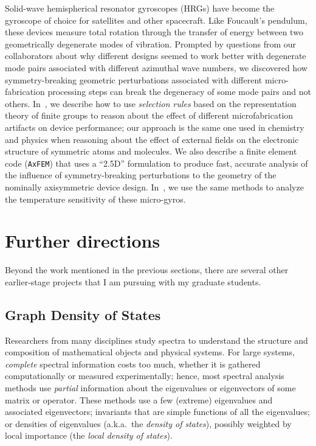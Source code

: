 \documentclass[11pt]{amsart}
\begin{document}
Solid-wave hemispherical resonator gyroscopes (HRGs) have become the
gyroscope of choice for satellites and other spacecraft.  Like Foucault's
pendulum, these devices measure total rotation through the transfer
of energy between two geometrically degenerate modes of vibration.
Prompted by questions from our collaborators about why different designs
seemed to work better with degenerate mode pairs associated with
different azimuthal wave numbers, we discovered how symmetry-breaking
geometric perturbations associated with different micro-fabrication
processing steps can break the degeneracy of some mode pairs and
not others.
In~\cite{2013-sensors}, we describe how to use
{\em selection rules} based on the representation theory of
finite groups to reason about the effect of different microfabrication
artifacts on device performance; our approach is the
same one used in chemistry and physics when reasoning about the
effect of external fields on the electronic structure of
symmetric atoms and molecules.  We also describe a finite
element code ({\tt AxFEM}) that uses a ``2.5D'' formulation to
produce fast, accurate analysis of the influence of symmetry-breaking
perturbations to the geometry of the nominally axisymmetric
device design.  In~\cite{2016-sensors,2016-hh-workshop}, we use
the same methods to analyze the temperature sensitivity of these
micro-gyros.

\section{Further directions}
\label{sec-directions}

Beyond the work mentioned in the previous sections, there are
several other earlier-stage projects that I am pursuing with my
graduate students.

\subsection*{Graph Density of States}

Researchers from many disciplines study spectra to understand the
structure and composition of mathematical objects and physical systems.
For large systems, {\em complete} spectral information costs too much,
whether it is gathered computationally or measured experimentally;
hence, most spectral analysis methods use {\em partial} information
about the eigenvalues or eigenvectors of some matrix or operator.
These methods use a few (extreme) eigenvalues and
associated eigenvectors; invariants that are simple functions of all the
eigenvalues; or densities of eigenvalues (a.k.a.~the {\em density of states}),
possibly weighted by local importance (the {\em local density of states}).
\end{document}
